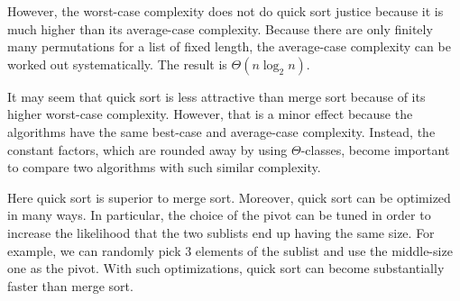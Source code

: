 However, the worst-case complexity does not do quick sort justice because it is much higher than its average-case complexity.
Because there are only finitely many permutations for a list of fixed length, the average-case complexity can be worked out systematically.
The result is $\Theta(n\log_2 n)$.
\medskip

It may seem that quick sort is less attractive than merge sort because of its higher worst-case complexity.
However, that is a minor effect because the algorithms have the same best-case and average-case complexity.
Instead, the constant factors, which are rounded away by using $\Theta$-classes, become important to compare two algorithms with such similar complexity.

Here quick sort is superior to merge sort.
Moreover, quick sort can be optimized in many ways.
In particular, the choice of the pivot can be tuned in order to increase the likelihood that the two sublists end up having the same size.
For example, we can randomly pick $3$ elements of the sublist and use the middle-size one as the pivot.
With such optimizations, quick sort can become substantially faster than merge sort.

% 
%
%
%
%
